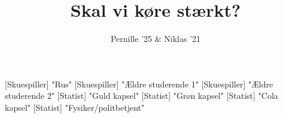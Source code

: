 \documentclass[a4paper,11pt]{article}
\title{Skal vi køre stærkt?}
\author{Pernille '25 \& Niklas '21}
\begin{document}
\maketitle

\begin{roles}
[Skuespiller] "Rus" 
[Skuespiller] "Ældre studerende 1"
[Skuespiller] "Ældre studerende 2"
[Statist] "Guld kapsel"
[Statist] "Grøn kapsel"
[Statist] "Cola kapsel"
[Statist] "Fysiker/politbetjent"
\end{roles}

\begin{props}
\end{props}
\end{document}
